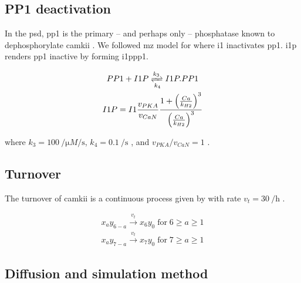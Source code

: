 \documentclass[9pt,lineno,doublespacing]{elife}
\begin{document}
{\subsection{PP1 deactivation}\label{subsec:pp1_deactivation} 

In the \gls{psd}, \gls{pp1} is the primary -- and perhaps only -- phosphatase
known to dephosphorylate \gls{camkii} \citep{strack_translocation_1997}.  We
followed \gls{mz} model for  where \gls{i1} inactivates \gls{pp1}. 
\Gls{i1p} renders \gls{pp1} inactive by forming \gls{i1ppp1}. 

\begin{equation}\label{eq:i1pandpp1}
    \begin{gathered}
        PP1 + I1P \xrightleftharpoons[k_4]{k_3} I1P.PP1 \\
        I1P = I1 \frac{v_{PKA}}{v_{CaN}} 
            \frac{1+\left(\frac{Ca}{k_{H2}}\right)^3}{\left(\frac{Ca}{k_{H2}}\right)^3}
    \end{gathered}
\end{equation}

\noindent where $k_3=\SI{100}{\per\micro M\per\second}$,
$k_4=\SI{0.1}{\per\second}$ \citep{endo_multiple_1996}, and $v_{PKA}/v_{CaN}=1$
\citep{miller_stability_2005}.

\subsection{Turnover}\label{turnover}

The turnover of \gls{camkii} is a continuous process given by  with rate
$v_{t}=\SI{30}{\per\hour}$ \citep{ehlers_activity_2003}.

\begin{equation} \label{eq:turnover}
    \begin{gathered}
        x_ay_{6-a} \xrightarrow{v_t} x_6y_0\; \text{for}\; 6\ge a\ge 1 \\
        x_ay_{7-a} \xrightarrow{v_t} x_7y_0\; \text{for}\; 7\ge a\ge 1
    \end{gathered}
\end{equation}

\subsection{Diffusion and simulation method}\label{subsec:simulator}

}
\end{document}
